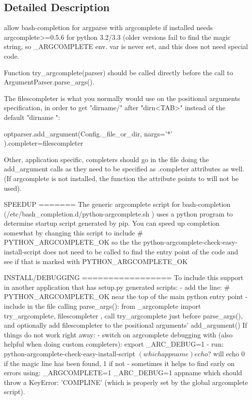 \subsection{Detailed Description}
\begin{DoxyVerb}allow bash-completion for argparse with argcomplete if installed
needs argcomplete>=0.5.6 for python 3.2/3.3 (older versions fail
to find the magic string, so _ARGCOMPLETE env. var is never set, and
this does not need special code.

Function try_argcomplete(parser) should be called directly before
the call to ArgumentParser.parse_args().

The filescompleter is what you normally would use on the positional
arguments specification, in order to get "dirname/" after "dirn<TAB>"
instead of the default "dirname ":

   optparser.add_argument(Config._file_or_dir, nargs='*'
                           ).completer=filescompleter

Other, application specific, completers should go in the file
doing the add_argument calls as they need to be specified as .completer
attributes as well. (If argcomplete is not installed, the function the
attribute points to will not be used).

SPEEDUP
=======
The generic argcomplete script for bash-completion
(/etc/bash_completion.d/python-argcomplete.sh )
uses a python program to determine startup script generated by pip.
You can speed up completion somewhat by changing this script to include
  # PYTHON_ARGCOMPLETE_OK
so the the python-argcomplete-check-easy-install-script does not
need to be called to find the entry point of the code and see if that is
marked  with PYTHON_ARGCOMPLETE_OK

INSTALL/DEBUGGING
=================
To include this support in another application that has setup.py generated
scripts:
- add the line:
# PYTHON_ARGCOMPLETE_OK
  near the top of the main python entry point
- include in the file calling parse_args():
from _argcomplete import try_argcomplete, filescompleter
   , call try_argcomplete just before parse_args(), and optionally add
   filescompleter to the positional arguments' add_argument()
If things do not work right away:
- switch on argcomplete debugging with (also helpful when doing custom
  completers):
export _ARC_DEBUG=1
- run:
python-argcomplete-check-easy-install-script $(which appname)
echo $?
  will echo 0 if the magic line has been found, 1 if not
- sometimes it helps to find early on errors using:
_ARGCOMPLETE=1 _ARC_DEBUG=1 appname
  which should throw a KeyError: 'COMPLINE' (which is properly set by the
  global argcomplete script).
\end{DoxyVerb}
 